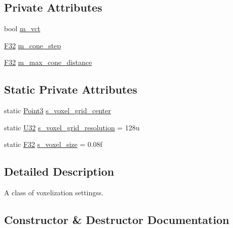 \subsection*{Private Attributes}
\begin{DoxyCompactItemize}
\item 
bool \mbox{\hyperlink{classmage_1_1rendering_1_1_voxelization_settings_ac2edf702f2441db192bef28ec616b873}{m\+\_\+vct}}
\item 
\mbox{\hyperlink{namespacemage_aa97e833b45f06d60a0a9c4fc22ae02c0}{F32}} \mbox{\hyperlink{classmage_1_1rendering_1_1_voxelization_settings_a929769d77a323333146ae937bd5e5307}{m\+\_\+cone\+\_\+step}}
\item 
\mbox{\hyperlink{namespacemage_aa97e833b45f06d60a0a9c4fc22ae02c0}{F32}} \mbox{\hyperlink{classmage_1_1rendering_1_1_voxelization_settings_adb6172810eba8f59553bcbb9e2a7cbe3}{m\+\_\+max\+\_\+cone\+\_\+distance}}
\end{DoxyCompactItemize}
\subsection*{Static Private Attributes}
\begin{DoxyCompactItemize}
\item 
static \mbox{\hyperlink{structmage_1_1_point3}{Point3}} \mbox{\hyperlink{classmage_1_1rendering_1_1_voxelization_settings_a37151063ebbf6ae6ea193fb0ce05d270}{s\+\_\+voxel\+\_\+grid\+\_\+center}}
\item 
static \mbox{\hyperlink{namespacemage_aa5d6eaabaac3cdd01873d6a3d27e90f3}{U32}} \mbox{\hyperlink{classmage_1_1rendering_1_1_voxelization_settings_aa709675f6700320077718e1954854ca6}{s\+\_\+voxel\+\_\+grid\+\_\+resolution}} = 128u
\item 
static \mbox{\hyperlink{namespacemage_aa97e833b45f06d60a0a9c4fc22ae02c0}{F32}} \mbox{\hyperlink{classmage_1_1rendering_1_1_voxelization_settings_a647150f56ef8546b6e18f5ad8dd2e661}{s\+\_\+voxel\+\_\+size}} = 0.\+08f
\end{DoxyCompactItemize}


\subsection{Detailed Description}
A class of voxelization settingss. 

\subsection{Constructor \& Destructor Documentation}
\mbox{\label{classmage_1_1rendering_1_1_voxelization_settings_a5c866be104571097091b07f113b2f680}} 
